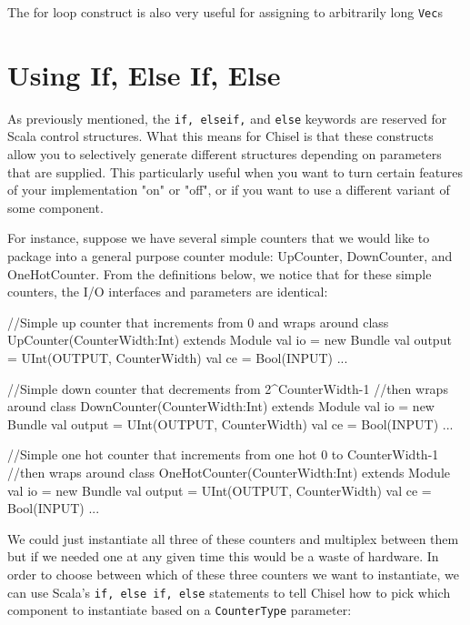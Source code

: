 \documentclass[twocolumn, 10pt]{article}
\begin{document}
The for loop construct is also very useful for assigning to arbitrarily long \verb+Vec+s 

\section{Using If, Else If, Else}

As previously mentioned, the \verb+if, elseif,+ and \verb+else+ keywords are reserved for Scala control structures. What this means for Chisel is that these constructs allow you to selectively generate different structures depending on parameters that are supplied. This particularly useful when you want to turn certain features of your implementation "on" or "off", or if you want to use a different variant of some component.

For instance, suppose we have several simple counters that we would like to package into a general purpose counter module: UpCounter, DownCounter, and OneHotCounter. From the definitions below, we notice that for these simple counters, the I/O interfaces and parameters are identical:

\begin{scala}
//Simple up counter that increments from 0 and wraps around
class UpCounter(CounterWidth:Int) extends Module {
  val io = new Bundle {
    val output = UInt(OUTPUT, CounterWidth)
    val ce     = Bool(INPUT)
  }...
}

//Simple down counter that decrements from 2^CounterWidth-1
//then wraps around
class DownCounter(CounterWidth:Int) extends Module{
  val io = new Bundle {
    val output = UInt(OUTPUT, CounterWidth)
    val ce     = Bool(INPUT)
  }...
}

//Simple one hot counter that increments from one hot 0 to CounterWidth-1 
//then wraps around
class OneHotCounter(CounterWidth:Int) extends Module {
  val io = new Bundle {
      val output = UInt(OUTPUT, CounterWidth)
      val ce     = Bool(INPUT)
  }...
}
\end{scala}

We could just instantiate all three of these counters and multiplex between them but if we needed one at any given time this would be a waste of hardware. In order to choose between which of these three counters we want to instantiate, we can use Scala's \verb+if, else if, else+ statements to tell Chisel how to pick which component to instantiate based on a \verb+CounterType+ parameter:
\end{document}

